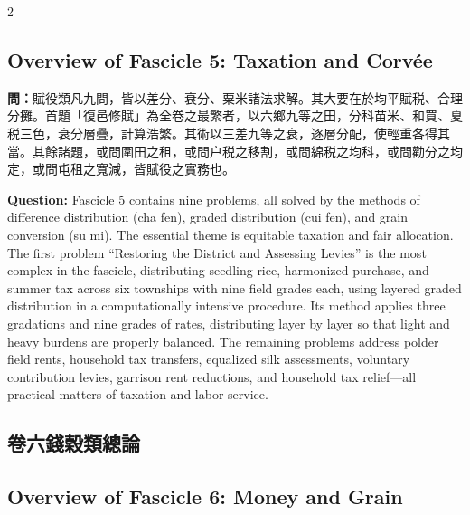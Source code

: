 \documentclass[11pt,a4paper]{article}
\newcommand{\QuestionText}[1]{\par\noindent\textbf{\color{problemcolor}問：}#1\par}
\newcommand{\QuestionEn}[1]{\par\noindent\textbf{\color{problemcolor}Question:} #1\par}
\begin{document}
\begin{paracol}{2}
\subsection*{Overview of Fascicle 5: Taxation and Corv\'{e}e}
\switchcolumn*

\QuestionText{賦役類凡九問，皆以差分、衰分、粟米諸法求解。其大要在於均平賦税、合理分攤。首題「復邑修賦」為全卷之最繁者，以六鄉九等之田，分科苗米、和買、夏税三色，衰分層疊，計算浩繁。其術以三差九等之衰，逐層分配，使輕重各得其當。其餘諸題，或問圍田之租，或問户税之移割，或問綿税之均科，或問勸分之均定，或問屯租之寬減，皆賦役之實務也。}
\switchcolumn
\QuestionEn{Fascicle 5 contains nine problems, all solved by the methods of difference distribution (cha fen), graded distribution (cui fen), and grain conversion (su mi). The essential theme is equitable taxation and fair allocation. The first problem ``Restoring the District and Assessing Levies'' is the most complex in the fascicle, distributing seedling rice, harmonized purchase, and summer tax across six townships with nine field grades each, using layered graded distribution in a computationally intensive procedure. Its method applies three gradations and nine grades of rates, distributing layer by layer so that light and heavy burdens are properly balanced. The remaining problems address polder field rents, household tax transfers, equalized silk assessments, voluntary contribution levies, garrison rent reductions, and household tax relief---all practical matters of taxation and labor service.}
\switchcolumn*

\subsection*{卷六錢穀類總論}
\switchcolumn
\subsection*{Overview of Fascicle 6: Money and Grain}
\switchcolumn*


\end{paracol}
\end{document}

